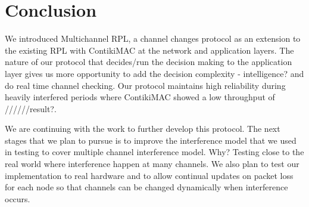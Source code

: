 \section{Conclusion}


We introduced Multichannel RPL, a channel changes protocol as an extension to the existing RPL with ContikiMAC at the network and application layers. The nature of our protocol that decides/run the decision making to the application layer gives us more opportunity to add the decision complexity - intelligence? and do real time channel checking. Our protocol maintains high reliability during heavily interfered periods where  ContikiMAC showed a low throughput of //////result?.

We are continuing with the work to further develop this protocol. The next stages that we plan to pursue is to improve the interference model that we used in testing to cover multiple channel interference model. Why? Testing close to the real world where interference happen at many channels. We also plan to test our implementation to real hardware and to allow continual updates on packet loss for each node so that channels can be changed dynamically when interference occurs.